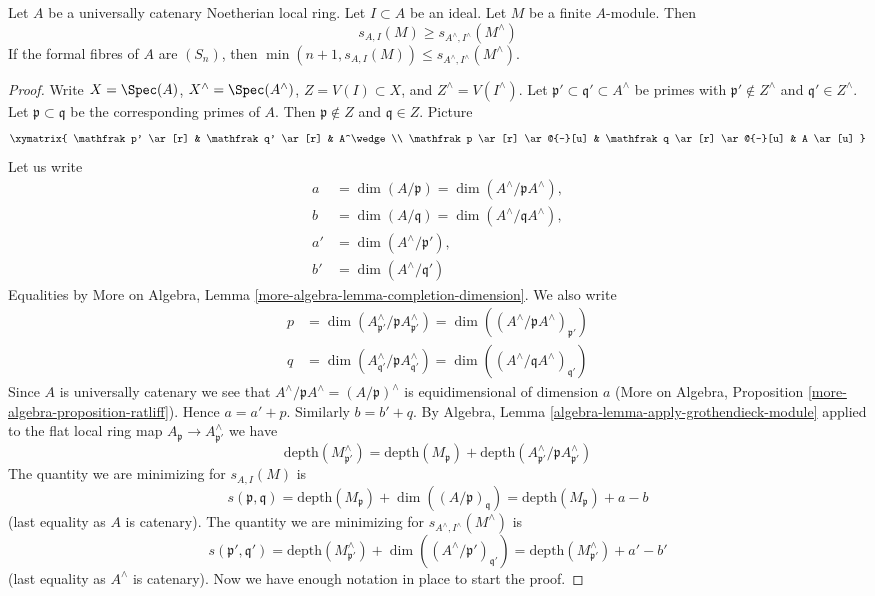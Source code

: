 \begin{lemma}
\label{lemma-cutoff-completion}
Let $A$ be a universally catenary Noetherian local ring.
Let $I \subset A$ be an ideal. Let $M$ be
a finite $A$-module. Then
$$
s_{A, I}(M) \geq s_{A^\wedge, I^\wedge}(M^\wedge)
$$
If the formal fibres of $A$ are $(S_n)$, then
$\min(n + 1, s_{A, I}(M)) \leq s_{A^\wedge, I^\wedge}(M^\wedge)$.
\end{lemma}

\begin{proof}
Write $X = \Spec(A)$, $X^\wedge = \Spec(A^\wedge)$, $Z = V(I) \subset X$, and
$Z^\wedge = V(I^\wedge)$.
Let $\mathfrak p' \subset \mathfrak q' \subset A^\wedge$
be primes with $\mathfrak p' \not \in Z^\wedge$ and
$\mathfrak q' \in Z^\wedge$. Let $\mathfrak p \subset \mathfrak q$
be the corresponding primes of $A$. Then $\mathfrak p \not \in Z$
and $\mathfrak q \in Z$. Picture
$$
\xymatrix{
\mathfrak p' \ar[r] & \mathfrak q' \ar[r] & A^\wedge \\
\mathfrak p \ar[r] \ar@{-}[u] &
\mathfrak q \ar[r] \ar@{-}[u] & A \ar[u]
}
$$
Let us write
\begin{align*}
a & = \dim(A/\mathfrak p) = \dim(A^\wedge/\mathfrak pA^\wedge),\\
b & = \dim(A/\mathfrak q) = \dim(A^\wedge/\mathfrak qA^\wedge),\\
a' & = \dim(A^\wedge/\mathfrak p'),\\
b' & = \dim(A^\wedge/\mathfrak q')
\end{align*}
Equalities by
More on Algebra, Lemma \ref{more-algebra-lemma-completion-dimension}.
We also write
\begin{align*}
p & = \dim(A^\wedge_{\mathfrak p'}/\mathfrak p A^\wedge_{\mathfrak p'}) =
\dim((A^\wedge/\mathfrak p A^\wedge)_{\mathfrak p'}) \\
q & = \dim(A^\wedge_{\mathfrak q'}/\mathfrak p A^\wedge_{\mathfrak q'}) =
\dim((A^\wedge/\mathfrak q A^\wedge)_{\mathfrak q'})
\end{align*}
Since $A$ is universally catenary we see that
$A^\wedge/\mathfrak pA^\wedge = (A/\mathfrak p)^\wedge$
is equidimensional of dimension $a$
(More on Algebra, Proposition \ref{more-algebra-proposition-ratliff}).
Hence $a = a' + p$. Similarly $b = b' + q$.
By Algebra, Lemma \ref{algebra-lemma-apply-grothendieck-module}
applied to the flat local ring map
$A_\mathfrak p \to A^\wedge_{\mathfrak p'}$
we have
$$
\text{depth}(M^\wedge_{\mathfrak p'})
=
\text{depth}(M_\mathfrak p) +
\text{depth}(A^\wedge_{\mathfrak p'} / \mathfrak p A^\wedge_{\mathfrak p'})
$$
The quantity we are minimizing for $s_{A, I}(M)$ is
$$
s(\mathfrak p, \mathfrak q) =
\text{depth}(M_\mathfrak p) + \dim((A/\mathfrak p)_\mathfrak q) =
\text{depth}(M_\mathfrak p) + a - b
$$
(last equality as $A$ is catenary). The quantity we are minimizing
for $s_{A^\wedge, I^\wedge}(M^\wedge)$
is
$$
s(\mathfrak p', \mathfrak q') =
\text{depth}(M^\wedge_{\mathfrak p'}) +
\dim((A^\wedge/\mathfrak p')_{\mathfrak q'}) =
\text{depth}(M^\wedge_{\mathfrak p'}) + a' - b'
$$
(last equality as $A^\wedge$ is catenary).
Now we have enough notation in place to start the proof.


\end{proof}
